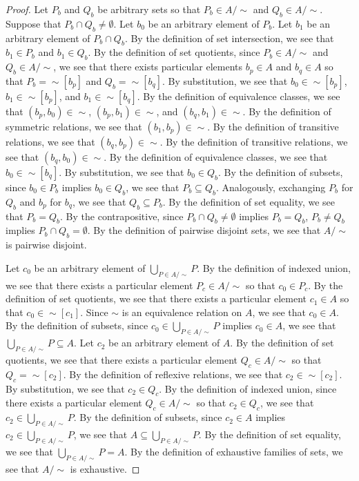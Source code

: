 \documentclass{amsart}
\numberwithin{equation}{section}
\begin{document}
\begin{problem}[manual-num=56]
\begin{enumerate}
\begin{proof}
				Let $P_b$ and $Q_b$ be arbitrary sets so that $P_b \in A / \sim$ and $Q_b \in A / \sim$.
				Suppose that $P_b \cap Q_b \neq \emptyset$.
				Let $b_0$ be an arbitrary element of $P_b$.
				Let $b_1$ be an arbitrary element of $P_b \cap Q_b$.
				By the definition of set intersection, we see that $b_1 \in P_b$ and $b_1 \in Q_b$.
				By the definition of set quotients, since $P_b \in A / \sim$ and $Q_b \in A / \sim$, we see that there exists particular elements $b_p \in A$ and $b_q \in A$ so that $P_b = \sim [b_p]$ and $Q_b = \sim [b_q]$.
				By substitution, we see that $b_0 \in \sim [b_p]$, $b_1 \in \sim [b_p]$, and $b_1 \in \sim [b_q]$.
				By the definition of equivalence classes, we see that $(b_p, b_0) \in \sim$, $(b_p, b_1) \in \sim$, and $(b_q, b_1) \in \sim$.
				By the definition of symmetric relations, we see that $(b_1, b_p) \in \sim$.
				By the definition of transitive relations, we see that $(b_q, b_p) \in \sim$.
				By the definition of transitive relations, we see that $(b_q, b_0) \in \sim$.
				By the definition of equivalence classes, we see that $b_0 \in \sim [b_q]$.
				By substitution, we see that $b_0 \in Q_b$.
				By the definition of subsets, since $b_0 \in P_b$ implies $b_0 \in Q_b$, we see that $P_b \subseteq Q_b$.
				Analogously, exchanging $P_b$ for $Q_b$ and $b_p$ for $b_q$, we see that $Q_b \subseteq P_b$.
				By the definition of set equality, we see that $P_b = Q_b$.
				By the contrapositive, since $P_b \cap Q_b \neq \emptyset$ implies $P_b = Q_b$, $P_b \neq Q_b$ implies $P_b \cap Q_b = \emptyset$.
				By the definition of pairwise disjoint sets, we see that $A / \sim$ is pairwise disjoint.

				Let $c_0$ be an arbitrary element of $\bigcup_{P \in A / \sim} P$.
				By the definition of indexed union, we see that there exists a particular element $P_c \in A / \sim$ so that $c_0 \in P_c$.
				By the definition of set quotients, we see that there exists a particular element $c_1 \in A$ so that $c_0 \in \sim [c_1]$.
				Since $\sim$ is an equivalence relation on $A$, we see that $c_0 \in A$.
				By the definition of subsets, since $c_0 \in \bigcup_{P \in A / \sim} P$ implies $c_0 \in A$, we see that $\bigcup_{P \in A / \sim} P \subseteq A$.
				Let $c_2$ be an arbitrary element of $A$.
				By the definition of set quotients, we see that there exists a particular element $Q_c \in A / \sim$ so that $Q_c = \sim [c_2]$.
				By the definition of reflexive relations, we see that $c_2 \in \sim [c_2]$.
				By substitution, we see that $c_2 \in Q_c$.
				By the definition of indexed union, since there exists a particular element $Q_c \in A / \sim$ so that $c_2 \in Q_c$, we see that $c_2 \in \bigcup_{P \in A / \sim} P$.
				By the definition of subsets, since $c_2 \in A$ implies $c_2 \in \bigcup_{P \in A / \sim} P$, we see that $A \subseteq \bigcup_{P \in A / \sim} P$.
				By the definition of set equality, we see that $\bigcup_{P \in A / \sim} P = A$.
				By the definition of exhaustive families of sets, we see that $A / \sim$ is exhaustive.


\end{proof}
\end{enumerate}
\end{problem}
\end{document}
